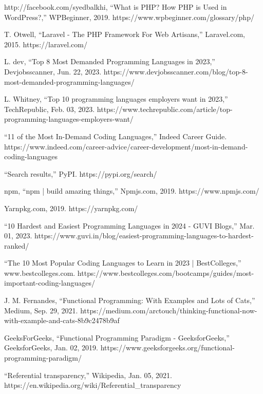 \documentclass[12pt]{report} %
\begin{document}
\begin{singlespace}
\begin{thebibliography}{}
             http://facebook.com/syedbalkhi, “What is PHP? How PHP is Used in WordPress?,” WPBeginner, 2019. https://www.wpbeginner.com/glossary/php/

             T. Otwell, “Laravel - The PHP Framework For Web Artisans,” Laravel.com, 2015. https://laravel.com/

             L. dev, “Top 8 Most Demanded Programming Languages in 2023,” Devjobsscanner, Jun. 22, 2023. https://www.devjobsscanner.com/blog/top-8-most-demanded-programming-languages/

             L. Whitney, “Top 10 programming languages employers want in 2023,” TechRepublic, Feb. 03, 2023. https://www.techrepublic.com/article/top-programming-languages-employers-want/

             “11 of the Most In-Demand Coding Languages,” Indeed Career Guide. https://www.indeed.com/career-advice/career-development/most-in-demand-coding-languages

             “Search results,” PyPI. https://pypi.org/search/

             npm, “npm | build amazing things,” Npmjs.com, 2019. https://www.npmjs.com/

             Yarnpkg.com, 2019. https://yarnpkg.com/

             “10 Hardest and Easiest Programming Languages in 2024 - GUVI Blogs,” Mar. 01, 2023. https://www.guvi.in/blog/easiest-programming-languages-to-hardest-ranked/

             “The 10 Most Popular Coding Languages to Learn in 2023 | BestColleges,” www.bestcolleges.com. https://www.bestcolleges.com/bootcamps/guides/most-important-coding-languages/

             J. M. Fernandes, “Functional Programming: With Examples and Lots of Cats,” Medium, Sep. 29, 2021. https://medium.com/arctouch/thinking-functional-now-with-example-and-cats-8b9c2478b9af            

             GeeksForGeeks, “Functional Programming Paradigm - GeeksforGeeks,” GeeksforGeeks, Jan. 02, 2019. https://www.geeksforgeeks.org/functional-programming-paradigm/

             “Referential transparency,” Wikipedia, Jan. 05, 2021. https://en.wikipedia.org/wiki/Referential\_transparency


\end{thebibliography}
\end{singlespace}
\end{document}
